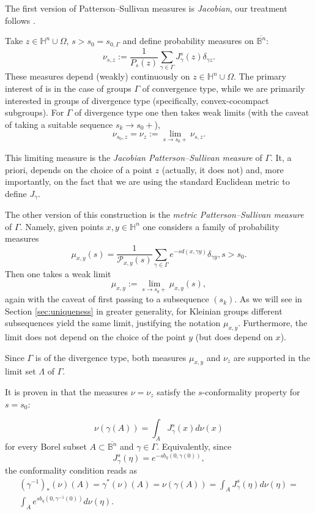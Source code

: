 \documentclass[12pt]{amsbook}%
\theoremstyle{definition}
\theoremstyle{remark}
\numberwithin{section}{chapter}
\numberwithin{subsection}{section}
\numberwithin{figure}{chapter}
\def\bH{{\mathbb{H}}}
\def\cP{{\mathscr{P}}}
\def\Ga{\Gamma}
\def\ga{\gamma}
\def\La{\Lambda}
\def\ol{\overline}
\begin{document}
{{The first version of Patterson--Sullivan measures is {\em Jacobian}, our treatment follows \cite{FMS}. 

Take $z\in \bH^n\cup \Omega$, $s> s_0=s_{0,\Gamma}$ and define probability measures on $\ol{\mathbb B^n}$:
$$
\nu_{s,z}:=\frac{1}{P_s(z)}\sum_{\ga\in \Ga} J^s_\gamma(z) \delta_{\gamma z}. 
$$
These measures depend (weakly) continuously on $z\in \bH^n\cup \Omega$.  The primary interest of \cite{FMS} is 
in the case of groups $\Gamma$ of convergence type, while we are primarily interested in groups of divergence type (specifically, convex-cocompact subgroups). %
For $\Ga$ of divergence type one then takes weak limits (with the caveat of taking a suitable 
sequence $s_k\to s_0+$), 
$$
\nu_{s_0,z}=\nu_z:=\lim_{s\to s_0+} \nu_{s,z}. 
$$

This limiting measure is the {\em Jacobian Patterson--Sullivan measure} of $\Ga$. It, a priori, depends on the choice of a point $z$ (actually, it does not) and, more importantly, on the fact that we are using the standard Euclidean metric to define $J_\ga$. 

\medskip
The other version of this construction is the {\em metric Patterson--Sullivan measure} of $\Ga$. Namely, given points 
$x, y\in \bH^n$ one considers a family of probability measures
$$
\mu_{x,y}(s)=\frac{1}{\cP_{x,y}(s)}\sum_{\ga\in\Ga} e^{-sd(x, \ga y)}\delta_{\ga y}, s> s_0. 
$$
Then one takes a weak limit
$$
\mu_{x,y}:= \lim_{s\to s_0+} \mu_{x,y}(s),
$$
again with the caveat of first passing to a subsequence $(s_k)$. As we will see in Section \ref{sec:uniqueness} in greater generality, for Kleinian groups different  subsequences yield the same limit, justifying the notation $\mu_{x,y}$. Furthermore, the limit does not depend on the choice 
of the point $y$ (but does depend on $x$). 

Since $\Ga$ is of the divergence type, both measures $\mu_{x,y}$ and $\nu_z$ are supported in the limit set $\La$ of $\Ga$. 


It is proven in \cite{FMS} that the measures $\nu=\nu_z$  satisfy the $s$-conformality property for $s=s_0$:

\begin{equation}\label{eq:conformal density}
\nu(\gamma(A))= \int_A J^s_\gamma(x) d\nu(x) 
\end{equation}
for every Borel subset $A\subset \ol{\mathbb B^n}$ and $\ga\in \Ga$. Equivalently, since 
$$
J^s_\gamma(\eta)=e^{-sb_\eta(0,\ga(0))},
$$
the conformality condition reads as 
\begin{align*}
(\ga^{-1})_*(\nu)(A)=\gamma^*(\nu)(A)=\nu(\gamma(A))= \int_A J^s_\gamma(\eta) d\nu(\eta)= \\
\int_A e^{sb_\eta(0,\gamma^{-1}(0))} d\nu(\eta).  
\end{align*}



}}
\end{document}
